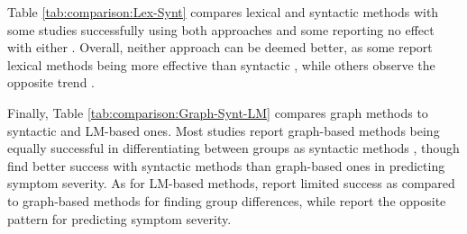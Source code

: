 Table \ref{tab:comparison:Lex-Synt} compares lexical and syntactic methods with some studies successfully using both approaches \citep{mitchell2015quantifying, just2020modeling, jeong2023exploring} and some reporting no effect with either \citep{liang2022widespread}. Overall, neither approach can be deemed better, as some report lexical methods being more effective than syntactic \citep{gupta2018automated, rezaii2019machine}, while others observe the opposite trend \citep{schneider2023syntactic, argolo2023burnishing}.

\begin{table}[ht]
\captionsetup{width=\textwidth}
\caption[Comparison of lexical and syntactic methods.]{\label{tab:comparison:Lex-Synt} Comparison between lexical and syntactic methods. 
\\ ``+'' indicates significant group difference or correlation for most metrics tested within the group. ``?'' indicates mixed results with some metrics showing significant results but not others. ``!'' indicates an absence of significant differences in the metrics tested. The studies on clinical high-risk populations are shown in italics.}
\end{table}

Finally, Table \ref{tab:comparison:Graph-Synt-LM} compares graph methods to syntactic and LM-based ones. Most studies report graph-based methods being equally successful in differentiating between groups as syntactic methods \citep{spencer2021lower, morgan2021natural, nettekoven2023semantic}, though \citet{argolo2023burnishing} find better success with syntactic methods than graph-based ones in predicting symptom severity. As for LM-based methods, \citet{morgan2021natural} report limited success as compared to graph-based methods for finding group differences, while \citet{argolo2023burnishing} report the opposite pattern for predicting symptom severity.

